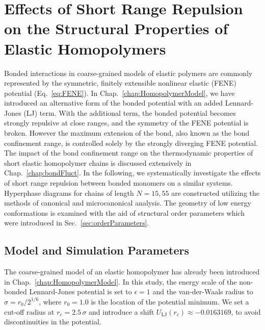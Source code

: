 \documentclass[12pt]{report}
\begin{document}

\chapter{Effects of Short Range Repulsion on the Structural Properties of Elastic Homopolymers}

Bonded interactions in coarse-grained models of elastic polymers are commonly represented by the symmetric, finitely extensible nonlinear elastic (FENE) potential (Eq.~\ref{eq:FENE}). In Chap.~\ref{chap:HomopolymerModel}, we have introduced an alternative form of the bonded potential with an added Lennard-Jones (LJ) term. With the additional term, the bonded potential becomes strongly repulsive at close ranges, and the symmetry of the FENE potential is broken. However the maximum extension of the bond, also known as the bond confinement range, is controlled solely by the strongly diverging FENE potential.  The impact of the bond confinement range on the thermodynamic properties of short elastic homopolymer chains is discussed extensively in Chap.~\ref{chap:bondFluct}. In the following, we systematically investigate the effects of short range repulsion between bonded monomers on a similar systems. 
\newpage
\noindent
Hyperphase diagrams for chains of length $N = 15,55$ are constructed utilizing the methods of canonical and microcanonical analysis. The geometry of low energy conformations is examined with the aid of structural order parameters which were introduced in Sec.~\ref{sec:orderParameters}.

\section{Model and Simulation Parameters}
The coarse-grained model of an elastic homopolymer has already been introduced in Chap.~\ref{chap:HomopolymerModel}. In this study, the energy scale of the non-bonded Lennard-Jones potential is set to $\epsilon=1$ and the van-der-Waals radius to $\sigma=r_0/2^{1/6}$, where $r_0 = 1.0$ is the location of the potential minimum. We set a cut-off radius at $r_c=2.5\,\sigma$ and introduce a shift $U_{\mathrm{LJ}}(r_{c}) \approx -0.0163169$, to avoid discontinuities in the potential.
\end{document}
